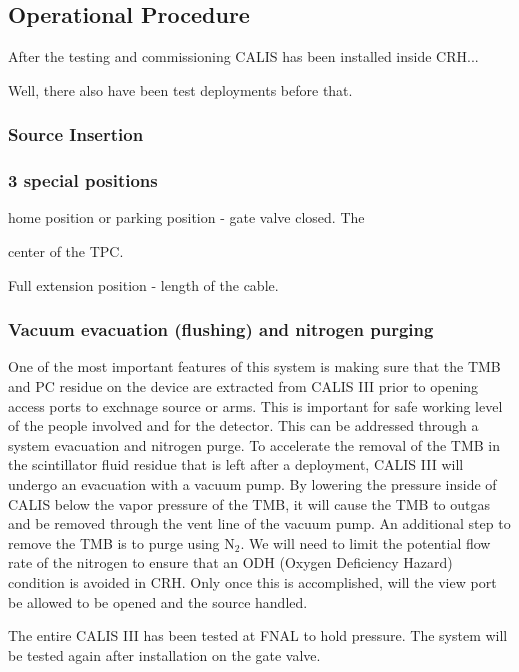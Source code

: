 
\subsection{Operational Procedure}
After the testing and commissioning CALIS has been installed inside CRH... 

Well, there also have been test deployments before that.
\subsubsection{Source Insertion}

\subsubsection{3 special positions}
home position or parking position - gate valve closed. The 

center of the TPC.

Full extension position - length of the cable.


\subsubsection{Vacuum evacuation (flushing) and nitrogen purging}
   One of the most important features of this system is making sure that the TMB and PC residue on the device are extracted from CALIS III prior to opening access ports to exchnage source or arms. This is  important for  safe working level of the people involved and for the detector.  This can be addressed through a system evacuation and nitrogen purge.  To accelerate the removal of the TMB in the scintillator fluid residue that is left after a deployment, CALIS III will undergo an evacuation with a vacuum pump. By lowering the pressure inside of CALIS below the vapor pressure of the TMB, it will cause the TMB to outgas and be removed through the vent line of the vacuum pump. An additional step to remove the TMB is to purge using N$_{2}$.  We will need to limit the potential flow rate of the nitrogen to ensure that an ODH (Oxygen Deficiency Hazard) condition is avoided in CRH.  Only once this is accomplished, will the view port be allowed to be opened and the source handled.     
  
The entire CALIS III  has been tested at FNAL  to hold pressure.  The system will be tested again after installation on the gate valve.
 

